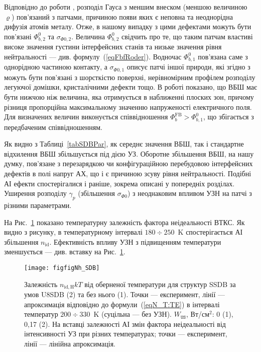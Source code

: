 Відповідно до роботи \cite{Jiang:DGJap},
розподіл Гауса з меншим внеском (меншою величиною $\varrho$) пов'язаний з патчами, причиною появи яких є
неповна та неоднорідна дифузія атомів металу.
Отже, в нашому випадку з цими дефектами можуть бути пов'язані $\Phi_{b,2}^0$ та $\sigma_{\Phi0,2}$.
Величина $\Phi_{b,2}^0$ свідчить про те, що таким патчам властиві високе значення густини інтерфейсних станів та низьке значення рівня нейтральності --- див. формулу~(\ref{eqFbfRoder}).
Водночас $\Phi_{b,1}^0$ пов'язана саме з однорідною частиною контакту,
а $\sigma_{\Phi0,1}$ описує патчі іншої природи, які згідно з \cite{Gammon2013} можуть бути пов'язані з шорсткістю поверхні,
нерівномірним профілем розподілу легуючої домішки, кристалічними дефекти тощо.
В роботі \cite{Rhoderick1988} показано, що ВБШ має бути нижчою ніж величина, яка отримується в наближенні плоских зон,
причому різниця пропорційна максимальному значенню напруженості електричного поля.
Для визначених величин виконується співвідношення $\Phi_{b}^\mathrm{FB}>\Phi_{b,1}^0$, що  збігається з передбаченим співвідношенням.

Як видно з Таблиці~\ref{tabSDBPar}, як середнє значення ВБШ, так і стандартне відхилення ВБШ збільшується під дією УЗ.
Оборотне збільшення ВБШ, на нашу думку, пов'язане з перезарядкою чи конфігураційною перебудовою інтерфейсних дефектів в полі напруг
АХ, що і є причиною зсуву рівня нейтральності.
Подібні АІ ефекти спостерігалися і раніше, зокрема описані у попередніх розділах.
Уширення розподілу $\gamma_p$ (збільшення $\sigma_{\Phi0}$) з неоднаковим впливом УЗН на патчі з різними параметрами.

На Рис.~\ref{figfigNh_SDB} показано температурну залежність фактора неідеальності ВТКС.
Як видно з рисунку, в температурному інтервалі $180\div250$~K спостерігається АІ збільшення $n_\mathrm{id}$.
Ефективність впливу УЗН з підвищенням температури зменшується --- див. вставку на Рис.~\ref{figfigNh_SDB}.

\begin{figure}
\center
\texttt{[image: figfigNh\_SDB]}
\caption{\label{figfigNh_SDB}
Залежність $n_\mathrm{id,H}kT$ від оберненої температури для структур SSDB за умов U8SDB (2) та без нього (1).
Точки --- експеримент, лінії --- апроксимація відповідно до формули~(\ref{eqN_T:TE}) в інтервалі
температур $200\div330$~K (суцільна --- без УЗН).
$W_\mathtt{US}$,  Вт/см$^2$: 0 (1), 0,17 (2).
На вставці залежності АІ змін фактора неідеальності від інтенсивності УЗ при різних температурах;
точки --- експеримент, лінії --- лінійна апроксимація.
}%
\end{figure}

